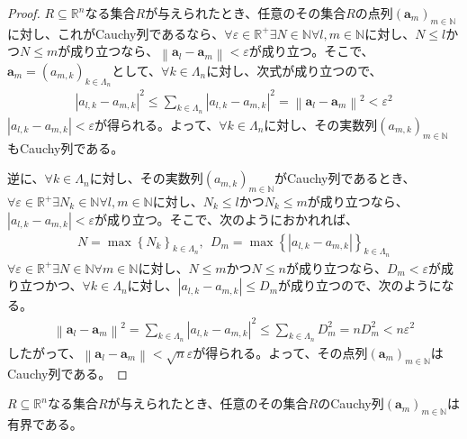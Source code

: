 \documentclass[dvipdfmx]{jsarticle}
\begin{document}
\begin{proof}
$R \subseteq \mathbb{R}^{n}$なる集合$R$が与えられたとき、任意のその集合$R$の点列$\left( \mathbf{a}_{m} \right)_{m \in \mathbb{N}}$に対し、これがCauchy列であるなら、$\forall\varepsilon \in \mathbb{R}^{+}\exists N \in \mathbb{N}\forall l,m \in \mathbb{N}$に対し、$N \leq l$かつ$N \leq m$が成り立つなら、$\left\| \mathbf{a}_{l} - \mathbf{a}_{m} \right\| < \varepsilon$が成り立つ。そこで、$\mathbf{a}_{m} = \left( a_{m,k} \right)_{k \in \varLambda_{n}}$として、$\forall k \in \varLambda_{n}$に対し、次式が成り立つので、
\begin{align*}
\left| a_{l,k} - a_{m,k} \right|^{2} \leq \sum_{k \in \varLambda_{n}}\left| a_{l,k} - a_{m,k} \right|^{2} = \left\| \mathbf{a}_{l} - \mathbf{a}_{m} \right\|^{2} < \varepsilon^{2}
\end{align*}
$\left| a_{l,k} - a_{m,k} \right| < \varepsilon$が得られる。よって、$\forall k \in \varLambda_{n}$に対し、その実数列$\left( a_{m,k} \right)_{m \in \mathbb{N}}$もCauchy列である。\par
逆に、$\forall k \in \varLambda_{n}$に対し、その実数列$\left( a_{m,k} \right)_{m \in \mathbb{N}}$がCauchy列であるとき、$\forall\varepsilon \in \mathbb{R}^{+}\exists N_{k} \in \mathbb{N}\forall l,m \in \mathbb{N}$に対し、$N_{k} \leq l$かつ$N_{k} \leq m$が成り立つなら、$\left| a_{l,k} - a_{m,k} \right| < \varepsilon$が成り立つ。そこで、次のようにおかれれば、
\begin{align*}
N = \max\left\{ N_{k} \right\}_{k \in \varLambda_{n}},\ \ D_{m} = \max\left\{ \left| a_{l,k} - a_{m,k} \right| \right\}_{k \in \varLambda_{n}}
\end{align*}
$\forall\varepsilon \in \mathbb{R}^{+}\exists N \in \mathbb{N}\forall m \in \mathbb{N}$に対し、$N \leq m$かつ$N \leq n$が成り立つなら、$D_{m} < \varepsilon$が成り立つかつ、$\forall k \in \varLambda_{n}$に対し、$\left| a_{l,k} - a_{m,k} \right| \leq D_{m}$が成り立つので、次のようになる。
\begin{align*}
\left\| \mathbf{a}_{l} - \mathbf{a}_{m} \right\|^{2} = \sum_{k \in \varLambda_{n}}\left| a_{l,k} - a_{m,k} \right|^{2} \leq \sum_{k \in \varLambda_{n}}D_{m}^{2} = nD_{m}^{2} < n\varepsilon^{2}
\end{align*}
したがって、$\left\| \mathbf{a}_{l} - \mathbf{a}_{m} \right\| < \sqrt{n}\varepsilon$が得られる。よって、その点列$\left( \mathbf{a}_{m} \right)_{m \in \mathbb{N}}$はCauchy列である。
\end{proof}
\begin{thm}\label{4.1.5.2}
$R \subseteq \mathbb{R}^{n}$なる集合$R$が与えられたとき、任意のその集合$R$のCauchy列$\left( \mathbf{a}_{m} \right)_{m \in \mathbb{N}}$は有界である。
\end{thm}
\end{document}
